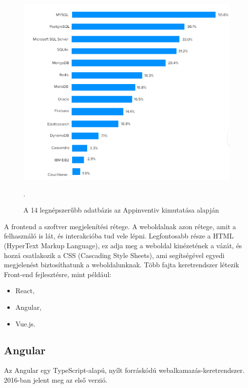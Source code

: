 \begin{figure}[h]
\centering
\includegraphics[scale=0.6]{images/top14_database.png}
\caption{A 14 legnépszerűbb adatbázis az Appinventiv kimutatása alapján \cite{databases}}.
\label{fig:Adatbázisok}
\end{figure}
\newpage


A frontend a szoftver megjelenítési rétege. A weboldalnak azon rétege, amit a felhasználó is lát, és interakcióba tud vele lépni. Legfontosabb része a HTML (HyperText Markup Language), ez adja meg a weboldal kinézetének a vázát, és hozzá csatlakozik a CSS (Cascading Style Sheets), ami segítségével egyedi megjelenést biztosíthatunk a weboldalunknak. Több fajta keretrendszer létezik Front-end fejlesztésre, mint például:

\begin{itemize}
\item React,
\item Angular,
\item Vue.js.
\end{itemize}


\subsection{Angular}

Az Angular \cite{Angular} egy TypeScript-alapú, nyílt forráskódú webalkamazás-keretrendszer. 2016-ban jelent meg az első verzió.

